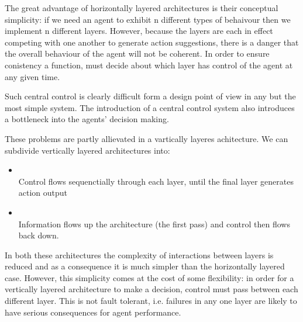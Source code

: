 The great advantage of horizontally layered architectures is their conceptual simplicity: if we need an agent to exhibit n different types of behaivour then we implement n different layers. However, because the layers are each in effect competing with one another to generate action suggestions, there is a danger that the overall behaviour of the agent will not be coherent. In order to ensure conistency a  function, must decide about which layer has control of the agent at any given time.

Such central control is clearly difficult form a design point of view in any but the most simple system. The introduction of a central control system also introduces a bottleneck into the agents' decision making.

These problems are partly allievated in a vartically layeres achitecture. We can subdivide vertically layered architectures into:
\begin{itemize}
\item {}\\
Control flows sequenctially through each layer, until the final layer generates action output
\item {}\\
Information flows up the architecture (the first pass) and control then flows back down.
\end{itemize}
In both these architectures the complexity of interactions between layers is reduced and as a consequence it is much simpler than the horizontally layered case. However, this simplicity comes at the cost of some flexibility: in order for a vertically layered architecture to make a decision, control must pass between each different layer. This is not fault tolerant, i.e. failures in any one layer are likely to have serious consequences for agent performance.

